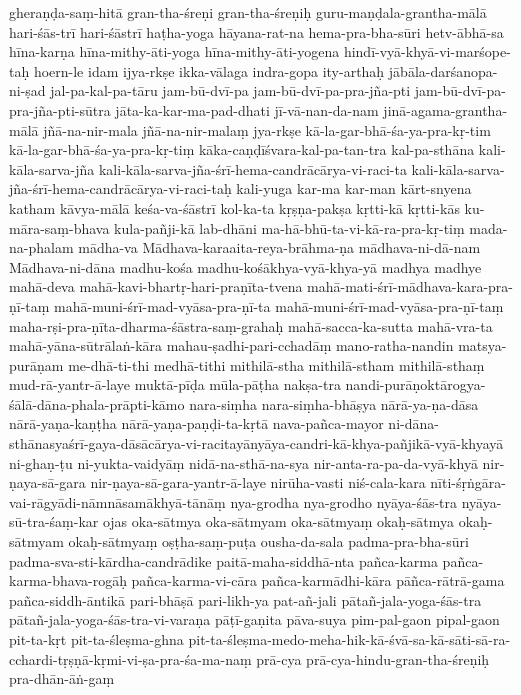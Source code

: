 {{gheraṇḍa-saṃ-hitā
gran-tha-śreṇi
gran-tha-śreṇiḥ
guru-maṇḍala-grantha-mālā
hari-śās-trī
hari-śāstrī
haṭha-yoga
hāyana-rat-na
hema-pra-bha-sūri
hetv-ābhā-sa
hīna-karṇa
hīna-mithy-āti-yoga
hīna-mithy-āti-yogena
hindī-vyā-khyā-vi-marśope-taḥ
hoern-le
idam
ijya-rkṣe
ikka-vālaga
indra-gopa
ity-arthaḥ
jābāla-darśanopa-ni-ṣad
jal-pa-kal-pa-tāru
jam-bū-dvī-pa
jam-bū-dvī-pa-pra-jña-pti
jam-bū-dvī-pa-pra-jña-pti-sūtra
jāta-ka-kar-ma-pad-dhati
jī-vā-nan-da-nam
jinā-agama-grantha-mālā
jñā-na-nir-mala
jñā-na-nir-malaṃ
jya-rkṣe
kā-la-gar-bhā-śa-ya-pra-kṛ-tim
kā-la-gar-bhā-śa-ya-pra-kṛ-tiṃ
kāka-caṇḍīśvara-kal-pa-tan-tra
kal-pa-sthāna
kali-kāla-sarva-jña
kali-kāla-sarva-jña-śrī-hema-candrācārya-vi-raci-ta
kali-kāla-sarva-jña-śrī-hema-candrācārya-vi-raci-taḥ
kali-yuga
kar-ma
kar-man
kārt-snyena
katham
kāvya-mālā
keśa-va-śāstrī
kol-ka-ta
kṛṣṇa-pakṣa
kṛtti-kā
kṛtti-kās
ku-māra-saṃ-bhava
kula-pañji-kā
lab-dhāni
ma-hā-bhū-ta-vi-kā-ra-pra-kṛ-tiṃ
mada-na-phalam
mādha-va
Mādhava-karaaita-reya-brāhma-ṇa
mādhava-ni-dā-nam
Mādhava-ni-dāna
madhu-kośa
madhu-kośākhya-vyā-khya-yā
madhya
madhye
mahā-deva
mahā-kavi-bhartṛ-hari-praṇīta-tvena
mahā-mati-śrī-mādhava-kara-pra-ṇī-taṃ
mahā-muni-śrī-mad-vyāsa-pra-ṇī-ta
mahā-muni-śrī-mad-vyāsa-pra-ṇī-taṃ
maha-rṣi-pra-ṇīta-dharma-śāstra-saṃ-grahaḥ
mahā-sacca-ka-sutta
mahā-vra-ta
mahā-yāna-sūtrālaṅ-kāra
mahau-ṣadhi-pari-cchadāṃ
mano-ratha-nandin
matsya-purāṇam
me-dhā-ti-thi
medhā-tithi
mithilā-stha
mithilā-stham
mithilā-sthaṃ
mud-rā-yantr-ā-laye
muktā-pīḍa
mūla-pāṭha
nakṣa-tra
nandi-purāṇoktārogya-śālā-dāna-phala-prāpti-kāmo
nara-siṃha
nara-siṃha-bhāṣya
nārā-ya-ṇa-dāsa
nārā-yaṇa-kaṇṭha
nārā-yaṇa-paṇḍi-ta-kṛtā
nava-pañca-mayor
ni-dāna-sthānasyaśrī-gaya-dāsācārya-vi-racitayānyāya-candri-kā-khya-pañjikā-vyā-khyayā
ni-ghaṇ-ṭu
ni-yukta-vaidyāṃ
nidā-na-sthā-na-sya
nir-anta-ra-pa-da-vyā-khyā
nir-ṇaya-sā-gara
nir-ṇaya-sā-gara-yantr-ā-laye
nirūha-vasti
niś-cala-kara
nīti-śṛṅgāra-vai-rāgyādi-nāmnāsamākhyā-tānāṃ
nya-grodha
nya-grodho
nyāya-śās-tra
nyāya-sū-tra-śaṃ-kar
ojas
oka-sātmya
oka-sātmyam
oka-sātmyaṃ
okaḥ-sātmya
okaḥ-sātmyam
okaḥ-sātmyaṃ
oṣṭha-saṃ-puṭa
ousha-da-sala
padma-pra-bha-sūri
padma-sva-sti-kārdha-candrādike
paitā-maha-siddhā-nta
pañca-karma
pañca-karma-bhava-rogāḥ
pañca-karma-vi-cāra
pañca-karmādhi-kāra
pāñca-rātrā-gama
pañca-siddh-āntikā
pari-bhāṣā
pari-likh-ya
pat-añ-jali
pātañ-jala-yoga-śās-tra
pātañ-jala-yoga-śās-tra-vi-varaṇa
pāṭī-gaṇita
pāva-suya
pim-pal-gaon
pipal-gaon
pit-ta-kṛt
pit-ta-śleṣma-ghna
pit-ta-śleṣma-medo-meha-hik-kā-śvā-sa-kā-sāti-sā-ra-cchardi-tṛṣṇā-kṛmi-vi-ṣa-pra-śa-ma-naṃ
prā-cya
prā-cya-hindu-gran-tha-śreṇiḥ
pra-dhān-āṅ-gaṃ
}}
